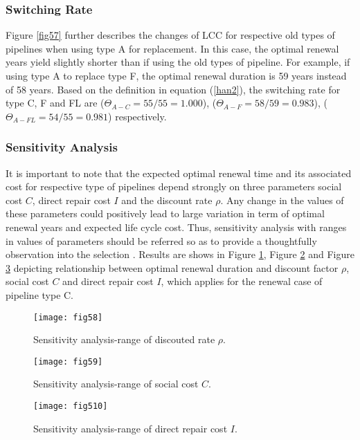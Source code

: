 \documentclass[a4paper,oneside,onecolumn,preprint,10pt,authoryear]{elsarticle}
\begin{document}
\subsubsection{Switching Rate}
\label{5823}
Figure \ref{fig57} further describes the changes of LCC for respective old types of pipelines when using type A for replacement. In this case, the optimal renewal years yield slightly shorter than if using the old types of pipeline. For example, if using type A to replace type F, the optimal renewal duration is 59 years instead of 58 years. Based on the definition in equation (\ref{han2}), the switching rate for type C, F and FL are ($\Theta_{A-C}=55/55=1.000$), ($\Theta_{A-F}=58/59=0.983$), ($\Theta_{A-FL}=54/55=0.981$) respectively.
\subsubsection{Sensitivity Analysis}
\label{5824}
It is important to note that the expected optimal renewal time and its associated cost for respective type of pipelines depend strongly on three parameters social cost $C$, direct repair cost $I$ and the discount rate $\rho$. Any change in the values of these parameters could positively lead to large variation in term of optimal renewal years and expected life cycle cost. Thus, sensitivity analysis with ranges in values of parameters should be referred so as to provide a thoughtfully observation into the selection \cite{senanalysis}. Results are shows in Figure \ref{fig58}, Figure \ref{fig59} and Figure \ref{fig510} depicting relationship between optimal renewal duration and discount factor $\rho$, social cost $C$ and direct repair cost $I$, which applies for the renewal case of pipeline type C.

\begin{figure}
\begin{center}
\texttt{[image: fig58]} 
\end{center}
\caption{Sensitivity analysis-range of discouted rate $\rho$.}
\label{fig58} 
\end{figure}
%
\begin{figure}
\begin{center}
\texttt{[image: fig59]} 
\end{center}
\caption{Sensitivity analysis-range of social cost $C$.}
\label{fig59} 
\end{figure}
%
\begin{figure}
\begin{center}
\texttt{[image: fig510]} 
\end{center}
\caption{Sensitivity analysis-range of direct repair cost $I$.}
\label{fig510} 
\end{figure}
\end{document}
